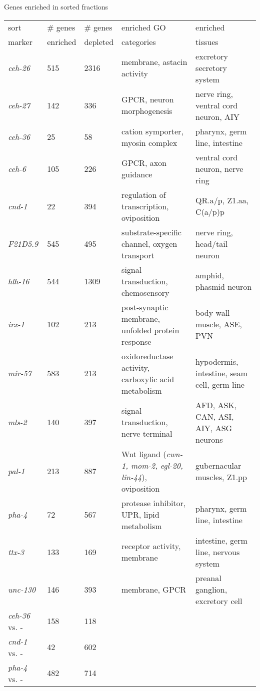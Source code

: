 \documentclass[serif,9pt]{beamer}
\begin{document}
\begin{frame}{Genes enriched in sorted fractions}

\begin{table}\tiny
\begin{tabular}{lll p{1.2in} p{1.2in} }
sort & \# genes & \# genes & enriched GO & enriched \\
marker & enriched & depleted & categories & tissues \\
\hline
{\em ceh-26} & 515 & 2316 & membrane, astacin activity & excretory secretory system \\
{\em ceh-27} & 142 & 336 & GPCR, neuron morphogenesis & nerve ring, ventral cord neuron, AIY \\
{\em ceh-36} & 25 & 58 & cation symporter, myosin complex & pharynx, germ line, intestine \\
{\em ceh-6} & 105 & 226 & GPCR, axon guidance & ventral cord neuron, nerve ring \\
{\em cnd-1} & 22 & 394 & regulation of transcription, oviposition & QR.a/p, Z1.aa, C(a/p)p \\
{\em F21D5.9} & 545 & 495 & substrate-specific channel, oxygen transport & nerve ring, head/tail neuron \\
{\em hlh-16} & 544 & 1309 & signal transduction, chemosensory & amphid, phasmid neuron \\
{\em irx-1} & 102 & 213 & post-synaptic membrane, unfolded protein response & body wall muscle, ASE, PVN \\
{\em mir-57} & 583 & 213 & oxidoreductase activity, carboxylic acid metabolism & hypodermis, intestine, seam cell, germ line \\
{\em mls-2} & 140 & 397 & signal transduction, nerve terminal & AFD, ASK, CAN, ASI, AIY, ASG neurons \\
{\em pal-1} & 213 & 887 & Wnt ligand ({\em cwn-1, mom-2, egl-20, lin-44}), oviposition & gubernacular muscles, Z1.pp      \\
{\em pha-4} & 72 & 567 & protease inhibitor, UPR, lipid metabolism & pharynx, germ line, intestine \\
{\em ttx-3} & 133 & 169 & receptor activity, membrane & intestine, germ line, nervous system \\
{\em unc-130} & 146 & 393 & membrane, GPCR & preanal ganglion, excretory cell \\
\hline
{\em ceh-36} vs. - & 158 & 118 & & \\
{\em cnd-1} vs. - & 42 & 602 & & \\
{\em pha-4} vs. - & 482 & 714 & &  \\
\end{tabular}
\end{table}

\end{frame}
\end{document}
